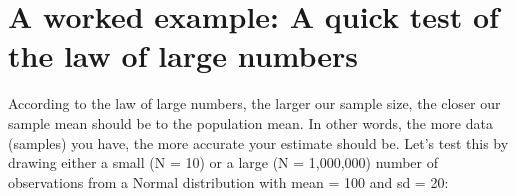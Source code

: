 \documentclass{tufte-book}\usepackage[]{graphicx}\usepackage[]{color}
\begin{document}







\section{A worked example: A quick test of the law of large numbers}

According to the law of large numbers, the larger our sample size, the closer our sample mean should be to the population mean. In other words, the more data (samples) you have, the more accurate your estimate should be. Let's test this by drawing either a small (N = 10) or a large (N = 1,000,000) number of observations from a Normal distribution with mean = 100 and sd = 20:
\end{document}
